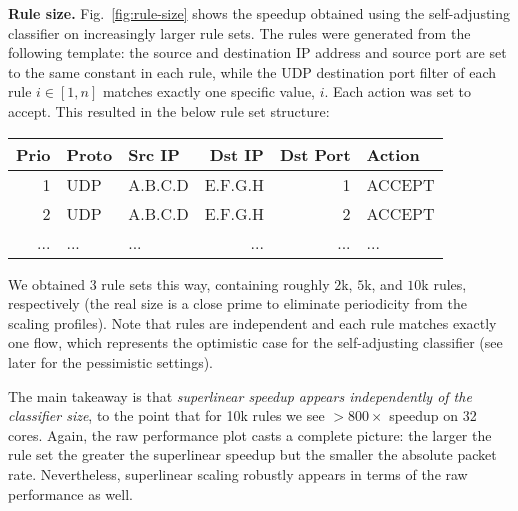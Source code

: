 \noindent
\textbf{Rule size.} %
Fig.~\ref{fig:rule-size} shows the speedup obtained using the self-adjusting classifier on increasingly larger rule sets. The rules were generated from the following template: the source and destination IP address and source port are set to the same constant in each rule, while the UDP destination port filter of each rule $i \in [1,n]$ matches exactly one specific value, $i$. Each action was set to accept. This resulted in the below rule set structure:
\begin{small}
  \begin{tabular}{r|l|l|r|r|l}
    \textbf{Prio} & \textbf{Proto} & \textbf{Src IP} & \textbf{Dst IP} & \textbf{Dst Port} & \textbf{Action}\\
    \hline
    1 & UDP & A.B.C.D   & E.F.G.H  & 1  & ACCEPT\\
    2 & UDP & A.B.C.D   & E.F.G.H  & 2  & ACCEPT\\
    ... & ... & ...   & ...  & ...  & ...\\
  \end{tabular}
\end{small}
We obtained 3 rule sets this way, containing roughly $2$k, $5$k, and $10$k rules, respectively (the real size is a close prime to eliminate periodicity from the scaling profiles). Note that rules are independent and each rule matches exactly one flow, which represents the optimistic case for the self-adjusting classifier (see later for the pessimistic settings).  

The main takeaway is that \emph{superlinear speedup appears independently of the classifier size}, to the point that for 10k rules we see $>800\times$ speedup on 32 cores. Again, the raw performance plot casts a complete picture: the larger the rule set the greater the superlinear speedup but the smaller the absolute packet rate. Nevertheless, superlinear scaling robustly appears in terms of the raw performance as well.

